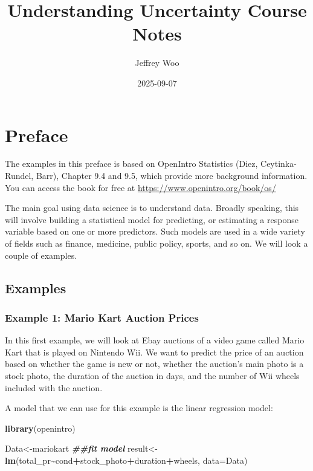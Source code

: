 \documentclass[
]{book}
\title{Understanding Uncertainty Course Notes}
\author{Jeffrey Woo}
\date{2025-09-07}
\newenvironment{Shaded}{\begin{snugshade}}{\end{snugshade}}
\newcommand{\AttributeTok}[1]{\textcolor[rgb]{0.13,0.29,0.53}{#1}}
\newcommand{\DocumentationTok}[1]{\textcolor[rgb]{0.56,0.35,0.01}{\textbf{\textit{#1}}}}
\newcommand{\FunctionTok}[1]{\textcolor[rgb]{0.13,0.29,0.53}{\textbf{#1}}}
\newcommand{\NormalTok}[1]{#1}
\newcommand{\OtherTok}[1]{\textcolor[rgb]{0.56,0.35,0.01}{#1}}
\newcommand{\SpecialCharTok}[1]{\textcolor[rgb]{0.81,0.36,0.00}{\textbf{#1}}}
\begin{document}
\maketitle

{
\setcounter{tocdepth}{1}
\tableofcontents
}
\hypertarget{preface}{%
\chapter*{Preface}\label{preface}}

The examples in this preface is based on OpenIntro Statistics (Diez, Ceytinka-Rundel, Barr), Chapter 9.4 and 9.5, which provide more background information. You can access the book for free at \url{https://www.openintro.org/book/os/}

The main goal using data science is to understand data. Broadly speaking, this will involve building a statistical model for predicting, or estimating a response variable based on one or more predictors. Such models are used in a wide variety of fields such as finance, medicine, public policy, sports, and so on. We will look a couple of examples.

\hypertarget{examples}{%
\section*{Examples}\label{examples}}

\hypertarget{example-1-mario-kart-auction-prices}{%
\subsection*{Example 1: Mario Kart Auction Prices}\label{example-1-mario-kart-auction-prices}}

In this first example, we will look at Ebay auctions of a video game called Mario Kart that is played on Nintendo Wii. We want to predict the price of an auction based on whether the game is new or not, whether the auction's main photo is a stock photo, the duration of the auction in days, and the number of Wii wheels included with the auction.

A model that we can use for this example is the linear regression model:

\begin{Shaded}
\begin{Highlighting}[]
\FunctionTok{library}\NormalTok{(openintro)}

\NormalTok{Data}\OtherTok{\textless{}{-}}\NormalTok{mariokart}
\DocumentationTok{\#\#fit model}
\NormalTok{result}\OtherTok{\textless{}{-}}\FunctionTok{lm}\NormalTok{(total\_pr}\SpecialCharTok{\textasciitilde{}}\NormalTok{cond}\SpecialCharTok{+}\NormalTok{stock\_photo}\SpecialCharTok{+}\NormalTok{duration}\SpecialCharTok{+}\NormalTok{wheels, }\AttributeTok{data=}\NormalTok{Data)}
\end{Highlighting}
\end{Shaded}
\end{document}
